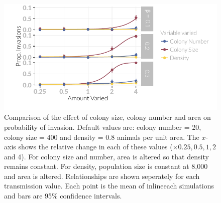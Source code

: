 \begin{knitrout}\footnotesize
{}\color{fgcolor}\begin{figure}[t]

{\centering \includegraphics[width=\textwidth]{figure/plotValueChangeMeans-1} 

}

\caption[Comparison of the probability of invasion when population size is altered by changing colony size or colony number.]{
Comparison of the effect of colony size, colony number and area on probability of invasion.
Default values are: colony number = 20, colony size = 400 and density = 0.8 animals per unit area.
The $x$-axis shows the relative change in each of these values ($\times 0.25, 0.5, 1, 2$ and $4$).
For colony size and number, area is altered so that density remains constant.
For density, population size is constant at 8,000 and area is altered.
Relationships are shown seperately for each transmission value.
Each point is the mean of 
inline{each} simulations and bars are 95\% confidence intervals.
}\label{fig:plotValueChangeMeans}
\end{figure}


\end{knitrout}










